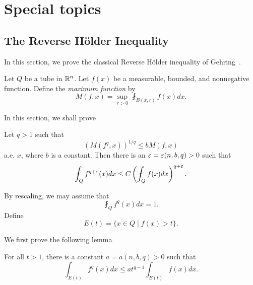 
 \chapter{Special topics}
 \section{The Reverse H\"older Inequality}
 In this section, we prove the classical Reverse H\"older inequality of Gehring~\cite{gehring}.
 
 
    Let $Q$ be a tube in $\mathbb R^n$. Let $f(x)$ be a measurable, bounded, and nonnegative function. Define the \emph{maximum function} by
\[
M(f, x)=\sup_{r>0}\,\fint_{B(x,r)} f(x) dx.
\]

In this section, we shall prove
\begin{theorem} Let $q>1$ such that 
\[
(M(f^q,x))^{1/q}\leq b M(f,x)
\]
a.e. $x$, where $b$ is a constant. Then there is an $\varepsilon=\varepsilon(n,b,q)>0$ such that 
\[
\fint_Q f^{q+\eps}(x) dx\leq C \left(\fint_Q f(x) dx\right)^{q+\eps}.
\]
\end{theorem}
 

 By rescaling, we may assume that 
 \begin{equation}\label{0}
 \fint_Q f^q(x) dx=1.
 \end{equation}
 Define
 \[
 E(t)=\{x\in Q\mid f(x)>t\}.
 \]
 

 
 We first prove the following lemma
 
 \begin{lemma}
For all $t>1$, there is a constant $a=a(n,b,q)>0$ such that 
\[
\int_{E(t)} f^q(x) dx\leq at^{q-1}\int_{E(t)} f(x) dx.
\]
\end{lemma}

